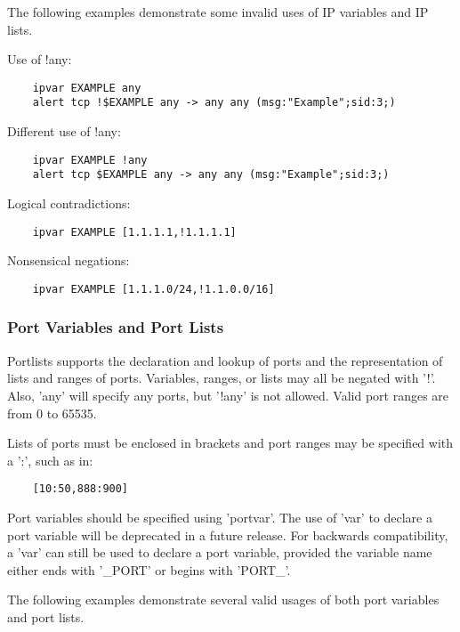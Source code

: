 \documentclass[english]{report}
\begin{document}
The following examples demonstrate some invalid uses of IP variables and IP
lists.

Use of !any:

\begin{verbatim}
    ipvar EXAMPLE any
    alert tcp !$EXAMPLE any -> any any (msg:"Example";sid:3;)
\end{verbatim}

Different use of !any:

\begin{verbatim}
    ipvar EXAMPLE !any
    alert tcp $EXAMPLE any -> any any (msg:"Example";sid:3;)
\end{verbatim}
        
Logical contradictions:

\begin{verbatim}
    ipvar EXAMPLE [1.1.1.1,!1.1.1.1]
\end{verbatim}

Nonsensical negations:

\begin{verbatim}
    ipvar EXAMPLE [1.1.1.0/24,!1.1.0.0/16]
\end{verbatim}


\subsubsection{Port Variables and Port Lists}

Portlists supports the declaration and lookup of ports and the representation
of lists and ranges of ports.  Variables, ranges, or lists may all be negated
with '!'.  Also, 'any' will specify any ports, but '!any' is not allowed.
Valid port ranges are from 0 to 65535.

Lists of ports must be enclosed in brackets and port ranges may be specified
with a ':', such as in:

\begin{verbatim}     
    [10:50,888:900]
\end{verbatim}

Port variables should be specified using 'portvar'.  The use of 'var' to
declare a port variable will be deprecated in a future release.  For backwards
compatibility, a 'var' can still be used to declare a port variable, provided
the variable name either ends with '\_PORT' or begins with 'PORT\_'. 

The following examples demonstrate several valid usages of both port variables
and port lists.
\end{document}
